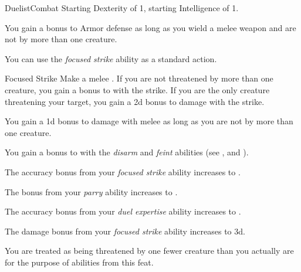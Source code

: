     \begin{feat}{Duelist}{Combat}
        \featpre Starting Dexterity of 1, starting Intelligence of 1.

         You gain a  bonus to Armor defense as long as you wield a melee weapon and are not  by more than one creature.

         You can use the \textit{focused strike} ability as a standard action.
        \begin{apability}{Focused Strike}
            Make a melee .
            If you are not threatened by more than one creature, you gain a  bonus to  with the strike.
            If you are the only creature threatening your target, you gain a \plus2d bonus to damage with the strike.
        \end{apability}

         You gain a \plus1d bonus to damage with melee  as long as you are not  by more than one creature.

         You gain a  bonus to  with the \textit{disarm} and \textit{feint} abilities (see , and ).

         The accuracy bonus from your \textit{focused strike} ability increases to .

         The bonus from your \textit{parry} ability increases to .

         The accuracy bonus from your \textit{duel expertise} ability increases to .

         The damage bonus from your \textit{focused strike} ability increases to \plus3d.

         You are treated as being threatened by one fewer creature than you actually are for the purpose of abilities from this feat.
    \end{feat}

